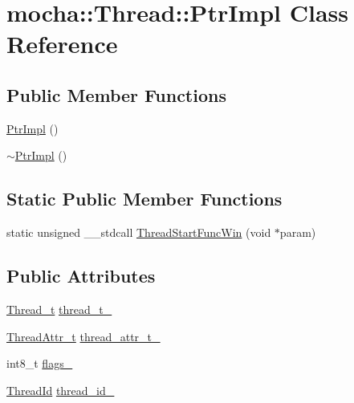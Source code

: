 \hypertarget{classmocha_1_1_thread_1_1_ptr_impl}{
\section{mocha::Thread::PtrImpl Class Reference}
\label{classmocha_1_1_thread_1_1_ptr_impl}
}
\subsection*{Public Member Functions}
\begin{DoxyCompactItemize}
\item 
\hyperlink{classmocha_1_1_thread_1_1_ptr_impl_a3274eb05f0367964bc091a99c6c0e9c6}{PtrImpl} ()
\item 
\hyperlink{classmocha_1_1_thread_1_1_ptr_impl_aaa049c87c27859f0f7965ec781882e5f}{$\sim$PtrImpl} ()
\end{DoxyCompactItemize}
\subsection*{Static Public Member Functions}
\begin{DoxyCompactItemize}
\item 
static unsigned \_\-\_\-stdcall \hyperlink{classmocha_1_1_thread_1_1_ptr_impl_a572cc625b75fb9312ec36994eb9be184}{ThreadStartFuncWin} (void $\ast$param)
\end{DoxyCompactItemize}
\subsection*{Public Attributes}
\begin{DoxyCompactItemize}
\item 
\hyperlink{namespacemocha_a276b270de0392644f77c3ba4323fa7b1}{Thread\_\-t} \hyperlink{classmocha_1_1_thread_1_1_ptr_impl_afe4d13dd159cba55254c67277f3e0df9}{thread\_\-t\_\-}
\item 
\hyperlink{namespacemocha_a313fa15a2b35cd776ba8a03af06e4910}{ThreadAttr\_\-t} \hyperlink{classmocha_1_1_thread_1_1_ptr_impl_a29a4de4bf4a3e973ca1dc3cfae2fe4b4}{thread\_\-attr\_\-t\_\-}
\item 
int8\_\-t \hyperlink{classmocha_1_1_thread_1_1_ptr_impl_a8668588839e2400dbce8e70a399f15a7}{flags\_\-}
\item 
\hyperlink{namespacemocha_a9fcf48a10671a66cd922f7e21d6efb6b}{ThreadId} \hyperlink{classmocha_1_1_thread_1_1_ptr_impl_a27bf45abeca59abe27ad15be2d12013d}{thread\_\-id\_\-}
\end{DoxyCompactItemize}
